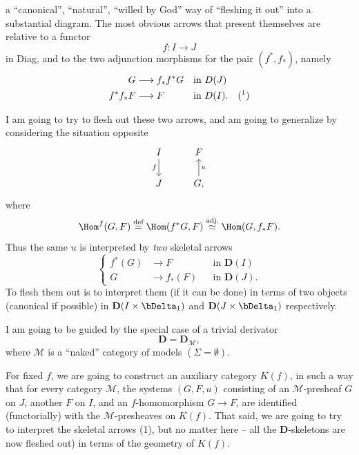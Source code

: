 a ``canonical'', ``natural'', ``willed by God'' way of ``fleshing it out'' into a substantial diagram. The most obvious arrows that present themselves are relative to a functor
\[ f : I \longrightarrow J \]
in Diag, and to the two adjunction morphisms for the pair $(f^*, f_*)$, namely
\[
\begin{aligned}
G &\longrightarrow f_*f^*G && \text{in } D(J)\\
f^*f_*F &\longrightarrow F && \text{in } D(I). \quad (\text{\footnotemark})
\end{aligned}
\]

I am going to try to flesh out these two arrows, and am going to generalize by considering the situation opposite 
\[
\begin{tikzcd}
I \arrow[d, "f"'] & F \\
J & G, \arrow[u, "u"']
\end{tikzcd}
\]
where
\[ \Hom^f(G,F) \overset{\text{def}}{=} \Hom(f^*G,F) \overset{\text{adj.}}{\simeq} \Hom(G,f_*F). \]
Thus the same $u$ is interpreted by \textit{two} skeletal arrows
\[
\left\{
\begin{aligned}
f^*(G) &\longrightarrow F && \text{in } \mathbf{D}(I)\\
G &\longrightarrow f_*(F) && \text{in } \mathbf{D}(J).
\end{aligned}
\right.
\tag*{(1)}
\]
To flesh them out is to interpret them (if it can be done) in terms of two objects (canonical if possible) in $\mathbf{D}(I \times \bDelta_1)$ and $\mathbf{D}(J \times \bDelta_1)$ respectively.

I am going to be guided by the special case of a trivial derivator
\[ \mathbf{D} = \mathbf{D}_{\mathcal{M}}, \]
where $\mathcal{M}$ is a ``naked'' category of models $(\Sigma = \emptyset)$.

For fixed $f$, we are going to construct an auxiliary category $K(f)$, in such a way that for every category $\mathcal{M}$, the systems $(G,F,u)$ consisting of an $\mathcal{M}$-presheaf $G$ on $J$, another $F$ on $I$, and an $f$-homomorphism $G \longrightarrow F$, are identified (functorially) with the $\mathcal{M}$-presheaves on
$K(f)$. That said, we are going to try to interpret the skeletal arrows (1), but no matter here -- all the $\mathbf{D}$-skeletons are now fleshed out) in terms of the geometry of $K(f)$. %

